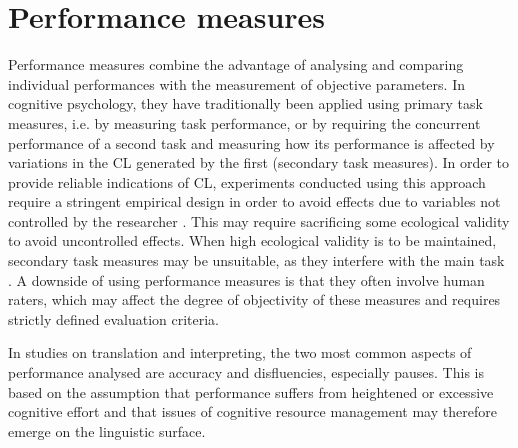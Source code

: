 \section{Performance measures} \label{performance_measures}
Performance measures combine the advantage of analysing and comparing individual performances with the measurement of objective parameters. In cognitive psychology, they have traditionally been applied using primary task measures, i.e. by measuring task performance, or by requiring the concurrent performance of a second task and measuring how its performance is affected by variations in the CL generated by the first (secondary task measures). In order to provide reliable indications of CL, experiments conducted using this approach require a stringent empirical design in order to avoid effects due to variables not controlled by the researcher \citep[20]{seeber_cognitive_2013}. This may require sacrificing some ecological validity to avoid uncontrolled effects. When high ecological validity is to be maintained, secondary task measures may be unsuitable, as they interfere with the main task \citep[227]{ehrensberger-dow_cognitive_2020}. A downside of using performance measures is that they often involve human raters, which may affect the degree of objectivity of these measures and requires strictly defined evaluation criteria.

In studies on translation and interpreting, the two most common aspects of performance analysed are accuracy and disfluencies, especially pauses. This is based on the assumption that performance suffers from heightened or excessive cognitive effort and that issues of cognitive resource management may therefore emerge on the linguistic surface.


